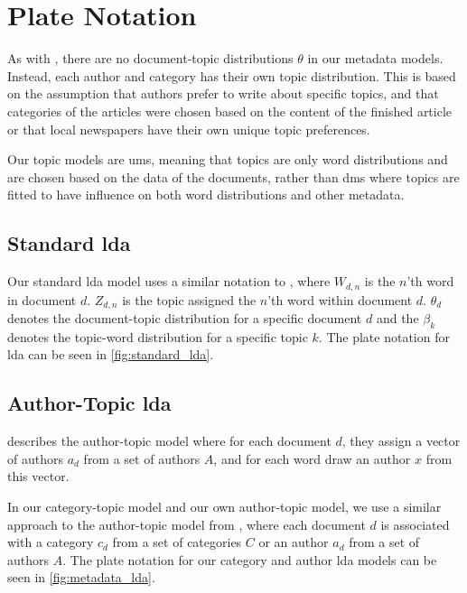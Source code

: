 \section{Plate Notation}
As with \citet{author_topic_2012}, there are no document-topic distributions $\theta$ in our metadata models.
Instead, each author and category has their own topic distribution.
This is based on the assumption that authors prefer to write about specific topics, and that categories of the articles were chosen based on the content of the finished article or that local newspapers have their own unique topic preferences.

Our topic models are \glspl{um}, meaning that topics are only word distributions and are chosen based on the data of the documents, rather than \glspl{dm} where topics are fitted to have influence on both word distributions and other metadata.

\subsection{Standard \gls{lda}}
Our standard \gls{lda} model uses a similar notation to \citet{blei2003latent}, where $W_{d,n}$ is the $n$'th word in document $d$.
$Z_{d,n}$ is the topic assigned the $n$'th word within document $d$.
$\theta_d$ denotes the document-topic distribution for a specific document $d$ and the $\beta_k$ denotes the topic-word distribution for a specific topic $k$.
The plate notation for \gls{lda} can be seen in \autoref{fig:standard_lda}.



\subsection{Author-Topic \gls{lda}}
\citet{author_topic_2012} describes the author-topic model where for each document $d$, they assign a vector of authors $a_d$ from a set of authors $A$, and for each word draw an author $x$ from this vector.

In our category-topic model and our own author-topic model, we use a similar approach to the author-topic model from \citeauthor{author_topic_2012}, where each document $d$ is associated with a category $c_d$ from a set of categories $C$ or an author $a_d$ from a set of authors $A$.
The plate notation for our category and author \gls{lda} models can be seen in \autoref{fig:metadata_lda}.

